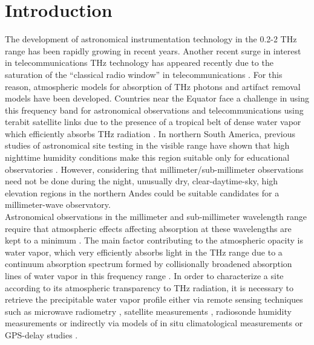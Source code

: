 \documentclass[a4paper,fleqn,usenatbib]{mnras}
\begin{document}
\section{Introduction}

The development of astronomical instrumentation technology in the 0.2-2 THz range has been rapidly growing in recent years. Another recent surge in interest in telecommunications THz technology has appeared recently due to the saturation of the ``classical radio window'' in telecommunications  \citep{newera}. For this reason, atmospheric models for absorption of THz photons \citep{rosenkranz,lababs} and artifact removal models \citep{removal} have been developed. Countries near the Equator face a challenge in using this frequency band for astronomical observations and telecommunications using terabit satellite links  \citep{suen2016} due to the presence of a tropical belt of dense water vapor which efficiently absorbs THz radiation \citep{tropicalbelt}. In northern South America, previous studies of astronomical site testing in the visible range have shown that high nighttime humidity conditions make this region suitable only for educational observatories \citep{pinzon}. However, considering that millimeter/sub-millimeter observations need not be done during the night, unusually dry, clear-daytime-sky, high elevation regions in the northern Andes could be suitable candidates for a millimeter-wave observatory. \\

Astronomical observations in the millimeter and sub-millimeter wavelength range require that atmospheric effects affecting absorption at these wavelengths are kept to a minimum \citep{southpole,radford2016,chajpwv}. The main factor contributing to the atmospheric opacity is water vapor, which very efficiently absorbs light in the THz range \citep{pardocerni,pardocerni2,cont350} due to a continuum absorption spectrum formed by collisionally broadened absorption lines of water vapor in this frequency range  \citep{linecont,submmlines,turner2009}. In order to characterize a site according to its atmospheric transparency to THz radiation, it is necessary to retrieve the precipitable water vapor profile either via remote sensing techniques such as microwave radiometry \citep{radiometer,paine2000fourier,southpole2}, satellite measurements \citep{aqua,spacemols,suen2014,spaceradio}, radiosonde humidity measurements \citep{radiosonde,radiosonde2} or indirectly via models of in situ climatological measurements \citep{climatology} or GPS-delay studies \citep{gpsorig,gpsmap}. \\
\end{document}

